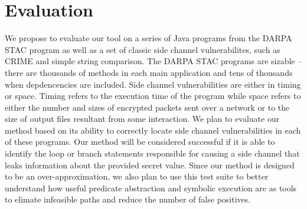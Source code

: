 \section{Evaluation}

We propose to evaluate our tool on a series of Java programs from the DARPA STAC program as well as a set of classic side channel vulnerabilites, such as CRIME \cite{crime} and simple string comparison. The DARPA STAC programs are sizable -- there are thousands of methods in each main application and tens of thousands when depdencencies are included. Side channel vulnerabilities are either in timing or space. Timing refers to the execution time of the program while space refers to either the number and sizes of encrypted packets sent over a network or to the size of output files resultant from some interaction. We plan to evaluate our method based on its ability to correctly locate side channel vulnerabilities in each of these programs. Our method will be considered successful if it is able to identify the loop or branch statements responsible for causing a side channel that leaks information about the provided secret value. Since our method is designed to be an over-approximation, we also plan to use this test suite to better understand how useful predicate abstraction and symbolic execution are as tools to elimate infeasible paths and reduce the number of false positives. 

